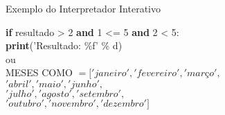 \begin{algorithm}
    \caption{Exemplo do Interpretador Interativo}
    \textbf{if} resultado > 2 \textbf{and} 1 <= 5  \textbf{and} 2 < 5:\\
    \textbf{print}('Resultado: \%f' \% d)\\
ou\\
MESES COMO $= ['janeiro', 'fevereiro', 'março',$\\
                $'abril',   'maio',      'junho',$\\
               $ 'julho',   'agosto',    'setembro',$\\
                $'outubro', 'novembro',  'dezembro']$\\
\end{algorithm}
